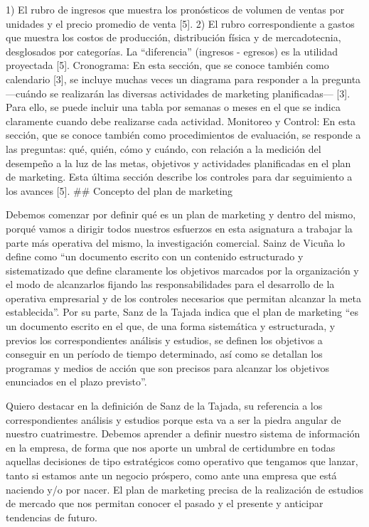 \documentclass[
]{book}
\begin{document}
1) El rubro de ingresos que muestra los pronósticos de volumen de ventas por unidades y el precio promedio de venta {[}5{]}.
2) El rubro correspondiente a gastos que muestra los costos de producción, distribución física y de mercadotecnia, desglosados por categorías.
La ``diferencia'' (ingresos - egresos) es la utilidad proyectada {[}5{]}.
Cronograma: En esta sección, que se conoce también como calendario {[}3{]}, se incluye muchas veces un diagrama para responder a la pregunta ---cuándo se realizarán las diversas actividades de marketing planificadas--- {[}3{]}. Para ello, se puede incluir una tabla por semanas o meses en el que se indica claramente cuando debe realizarse cada actividad.
Monitoreo y Control: En esta sección, que se conoce también como procedimientos de evaluación, se responde a las preguntas: qué, quién, cómo y cuándo, con relación a la medición del desempeño a la luz de las metas, objetivos y actividades planificadas en el plan de marketing.
Esta última sección describe los controles para dar seguimiento a los avances {[}5{]}.
\#\# Concepto del plan de marketing

Debemos comenzar por definir qué es un plan de marketing y dentro del mismo, porqué vamos a dirigir todos nuestros esfuerzos en esta asignatura a trabajar la parte más operativa del mismo, la investigación comercial. Sainz de Vicuña lo define como ``un documento escrito con un contenido estructurado y sistematizado que define claramente los objetivos marcados por la organización y el modo de alcanzarlos fijando las responsabilidades para el desarrollo de la operativa empresarial y de los controles necesarios que permitan alcanzar la meta establecida''. Por su parte, Sanz de la Tajada indica que el plan de marketing ``es un documento escrito en el que, de una forma sistemática y estructurada, y previos los correspondientes análisis y estudios, se definen los objetivos a conseguir en un período de tiempo determinado, así como se detallan los programas y medios de acción que son precisos para alcanzar los objetivos enunciados en el plazo previsto''.

Quiero destacar en la definición de Sanz de la Tajada, su referencia a los correspondientes análisis y estudios porque esta va a ser la piedra angular de nuestro cuatrimestre. Debemos aprender a definir nuestro sistema de información en la empresa, de forma que nos aporte un umbral de certidumbre en todas aquellas decisiones de tipo estratégicos como operativo que tengamos que lanzar, tanto si estamos ante un negocio próspero, como ante una empresa que está naciendo y/o por nacer. El plan de marketing precisa de la realización de estudios de mercado que nos permitan conocer el pasado y el presente y anticipar tendencias de futuro.
\end{document}
